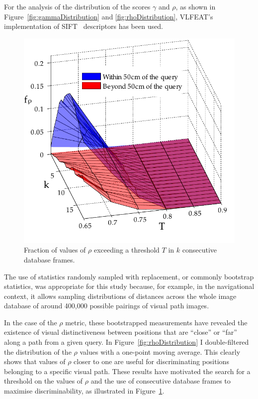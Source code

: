 For the analysis of the distribution of the scores $\gamma$ and $\rho$, as shown in Figure~\ref{fig:gammaDistribution} and \ref{fig:rhoDistribution}, VLFEAT's~\cite{Vedaldi2008} implementation of SIFT~\cite{Lowe2004} descriptors has been used.

\begin{figure}
\begin{center}
\includegraphics[width=.8\linewidth]{./gfx/Chapter02/C1twoTestWithBootstrapping2.pdf}
\caption{Fraction of values of $\rho$ exceeding a threshold $T$ in $k$ consecutive database frames.}
\label{fig:rocTwoParametersC5}
\end{center}
\end{figure}

The use of statistics randomly sampled with replacement, or commonly bootstrap statistics, was appropriate for this study because, for example, in the navigational context, it allows sampling distributions of distances across the whole image database of around 400,000 possible pairings of visual path images.

In the case of the $\rho$ metric, these bootstrapped measurements have revealed the existence of visual distinctiveness between positions that are ``close'' or ``far'' along a path from a given query. In Figure~\ref{fig:rhoDistribution} I double-filtered the distribution of the $\rho$ values with a one-point moving average. This clearly shows that values of $\rho$ closer to one are useful for discriminating positions belonging to a specific visual path. These results have motivated the search for a threshold on the values of $\rho$ and the use of consecutive database frames to maximise discriminability, as illustrated in Figure~\ref{fig:rocTwoParametersC5}.


